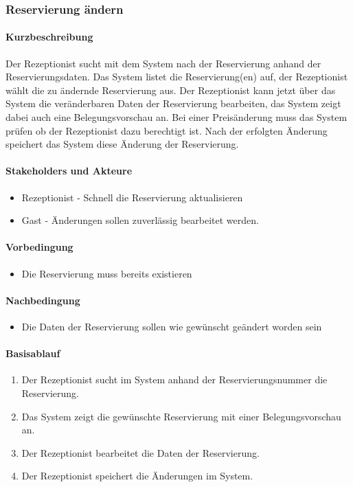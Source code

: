 \subsubsection{Reservierung ändern}

\paragraph{Kurzbeschreibung}
Der \Gls{Rezeptionist} sucht mit dem System nach der \Gls{Reservierung} anhand der Reservierungsdaten. Das System listet die \Gls{Reservierung}(en) auf,  der \Gls{Rezeptionist} wählt die zu ändernde \Gls{Reservierung} aus. Der \Gls{Rezeptionist} kann jetzt über das System die veränderbaren Daten der \Gls{Reservierung} bearbeiten, das System zeigt dabei auch eine \Gls{Belegungsvorschau} an. Bei einer Preisänderung muss das System prüfen ob der \Gls{Rezeptionist} dazu berechtigt ist. Nach der erfolgten Änderung speichert das System diese Änderung der \Gls{Reservierung}.

\paragraph{Stakeholders und Akteure}
\begin{itemize}
	\item \Gls{Rezeptionist} - Schnell die Reservierung aktualisieren
	\item \Gls{Gast} - Änderungen sollen zuverlässig bearbeitet werden.
\end{itemize}

\paragraph{Vorbedingung}
\begin{itemize}
	\item Die Reservierung muss bereits existieren
\end{itemize}

\paragraph{Nachbedingung}
\begin{itemize}
	\item Die Daten der Reservierung sollen wie gewünscht geändert worden sein
\end{itemize}

\paragraph{Basisablauf}
\begin{enumerate}
	\item Der \Gls{Rezeptionist} sucht im System anhand der \Gls{Reservierungsnummer} die \Gls{Reservierung}.
	\item Das System zeigt die gewünschte \Gls{Reservierung} mit einer Belegungsvorschau an.
	\item Der \Gls{Rezeptionist} bearbeitet die Daten der Reservierung.
	\item Der \Gls{Rezeptionist} speichert die Änderungen im System.
\end{enumerate}

